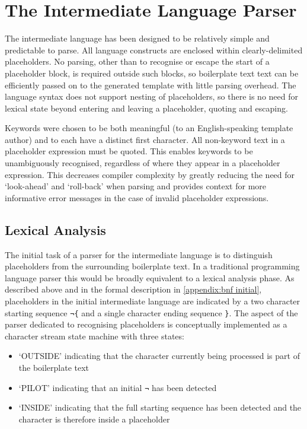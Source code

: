 \section*{The Intermediate Language Parser}
\label{gilt:parser}

The intermediate language has been designed to be relatively simple and predictable to parse. All language constructs are enclosed within clearly-delimited placeholders. No parsing, other than to recognise or escape the start of a placeholder block, is required outside such blocks, so boilerplate text text can be efficiently passed on to the generated template with little parsing overhead. The language syntax does not support nesting of placeholders, so there is no need for lexical state beyond entering and leaving a placeholder, quoting and escaping.

Keywords were chosen to be both meaningful (to an English-speaking template author) and to each have a distinct first character. All non-keyword text in a placeholder expression must be quoted. This enables keywords to be unambiguously recognised, regardless of where they appear in a placeholder expression. This decreases compiler complexity by greatly reducing the need for `look-ahead' and `roll-back' when parsing and provides context for more informative error messages in the case of invalid placeholder expressions.

\subsection*{Lexical Analysis}
\label{gilt:parser:lexical analysis}

The initial task of a parser for the intermediate language is to distinguish placeholders from the surrounding boilerplate text. In a traditional programming language parser this would be broadly equivalent to a lexical analysis phase. As described above and in the formal description in \autoref{appendix:bnf initial}, placeholders in the initial intermediate language are indicated by a two character starting sequence \verb!¬{! and a single character ending sequence \verb!}!. The aspect of the parser dedicated to recognising placeholders is conceptually implemented as a character stream state machine with three states:

\begin{itemize}
    \item `OUTSIDE' indicating that the character currently being processed is part of the boilerplate text
    \item `PILOT' indicating that an initial \verb!¬! has been detected
    \item `INSIDE' indicating that the full starting sequence has been detected and the character is therefore inside a placeholder
\end{itemize}

